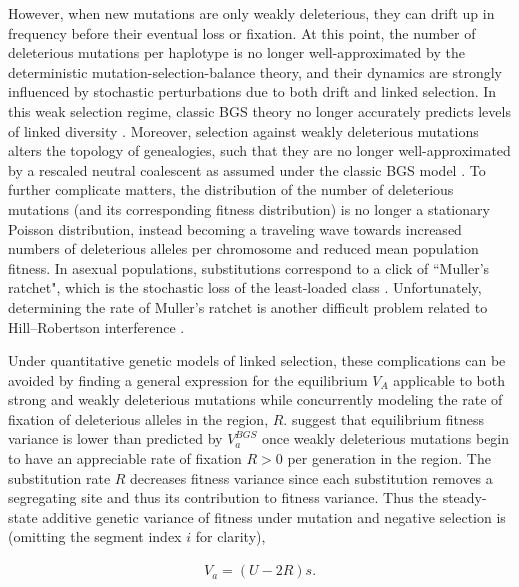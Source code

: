 \documentclass[11pt]{article}
\begin{document}
However, when new mutations are only weakly deleterious, they can drift up in
frequency before their eventual loss or fixation. At this point, the number of
deleterious mutations per haplotype is no longer well-approximated by the
deterministic mutation-selection-balance theory, and their dynamics are strongly
influenced by stochastic perturbations due to both drift and linked selection. 
In this weak selection regime, classic BGS theory no longer accurately predicts levels of linked diversity
\parencite{Charlesworth1993-gb,McVean2000-bt,Good2013-lp,Gordo2002-dr}.
Moreover, selection against weakly deleterious mutations alters the topology of genealogies, such that they are no longer well-approximated by a rescaled
neutral coalescent as assumed under the classic BGS model
\parencite{Przeworski1999-mb,OFallon2010-my,Higgs1995-xc}. To further
complicate matters, the distribution of the number of deleterious mutations
(and its corresponding fitness distribution) is no longer a stationary Poisson distribution, instead becoming a traveling wave
\parencite{Rouzine2008-qz,Good2013-lp,Gessler1995-hz} towards increased numbers
of deleterious alleles per chromosome and reduced mean population fitness.
In asexual populations, substitutions correspond to a click of ``Muller's ratchet", which is 
the stochastic loss of the least-loaded class \parencite{Muller1964-ki,Charlesworth1997-qn}.
Unfortunately, determining the rate of Muller's ratchet is another difficult problem
\parencite{Haigh1978-gt,Gordo2002-dr,Gessler1995-hz,Higgs1995-xc} related to
Hill--Robertson interference \parencite{Felsenstein1974-xm}.

Under quantitative genetic models of linked selection, these complications can
be avoided by finding a general expression for the equilibrium $V_A$ applicable
to both strong and weakly deleterious mutations while concurrently modeling the rate
of fixation of deleterious alleles in the region, $R$. \textcite{Santiago2016-mu}
suggest that equilibrium fitness variance is lower than predicted by
$V_{a}^{BGS}$ once weakly deleterious mutations begin to have an appreciable
rate of fixation $R > 0$ per generation in the region. The substitution rate $R$
decreases fitness variance since each substitution removes a segregating site 
and thus its contribution to fitness variance. Thus the steady-state additive 
genetic variance of fitness under mutation and negative selection is
(omitting the segment index $i$ for clarity),

\begin{align}
  \label{eq:Va}
  V_{a} = (U - 2 R)s. 
\end{align}
\end{document}
